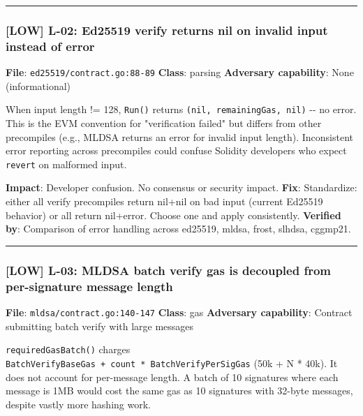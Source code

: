\documentclass[
]{article}
\begin{document}
\begin{center}\rule{0.5\linewidth}{0.5pt}\end{center}

\subsubsection{{[}LOW{]} L-02: Ed25519 verify returns nil on invalid
input instead of
error}\label{low-l-02-ed25519-verify-returns-nil-on-invalid-input-instead-of-error}

\textbf{File}: \texttt{ed25519/contract.go:88-89} \textbf{Class}:
parsing \textbf{Adversary capability}: None (informational)

When input length != 128, \texttt{Run()} returns
\texttt{(nil,\ remainingGas,\ nil)} -\/- no error. This is the EVM
convention for "verification failed" but differs from other precompiles
(e.g., MLDSA returns an error for invalid input length). Inconsistent
error reporting across precompiles could confuse Solidity developers who
expect \texttt{revert} on malformed input.

\textbf{Impact}: Developer confusion. No consensus or security impact.
\textbf{Fix}: Standardize: either all verify precompiles return nil+nil
on bad input (current Ed25519 behavior) or all return nil+error. Choose
one and apply consistently. \textbf{Verified by}: Comparison of error
handling across ed25519, mldsa, frost, slhdsa, cggmp21.

\begin{center}\rule{0.5\linewidth}{0.5pt}\end{center}

\subsubsection{{[}LOW{]} L-03: MLDSA batch verify gas is decoupled from
per-signature message
length}\label{low-l-03-mldsa-batch-verify-gas-is-decoupled-from-per-signature-message-length}

\textbf{File}: \texttt{mldsa/contract.go:140-147} \textbf{Class}: gas
\textbf{Adversary capability}: Contract submitting batch verify with
large messages

\texttt{requiredGasBatch()} charges
\texttt{BatchVerifyBaseGas\ +\ count\ *\ BatchVerifyPerSigGas} (50k + N
* 40k). It does not account for per-message length. A batch of 10
signatures where each message is 1MB would cost the same gas as 10
signatures with 32-byte messages, despite vastly more hashing work.
\end{document}

